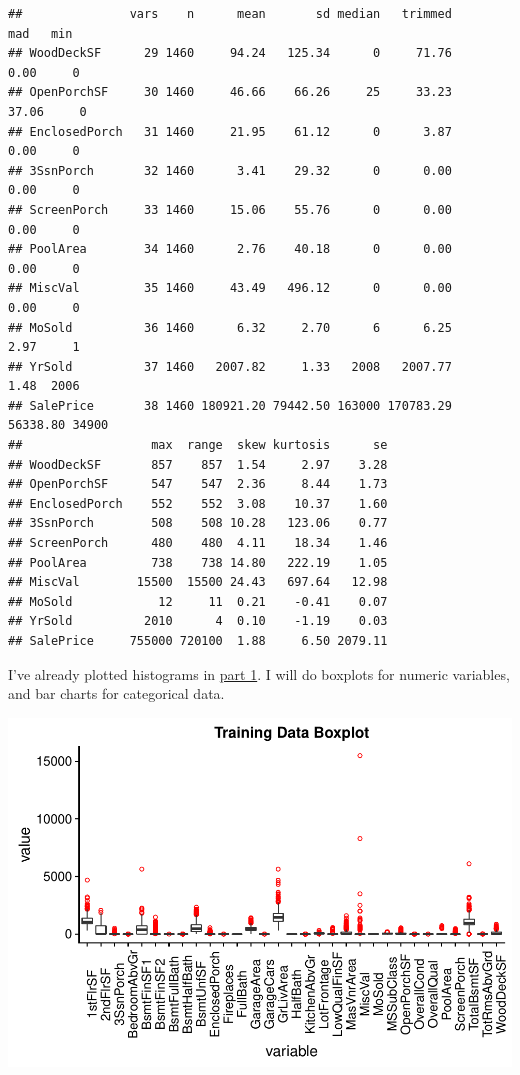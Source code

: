 \documentclass[]{article}
\begin{document}
\begin{verbatim}
##               vars    n      mean       sd median   trimmed      mad   min
## WoodDeckSF      29 1460     94.24   125.34      0     71.76     0.00     0
## OpenPorchSF     30 1460     46.66    66.26     25     33.23    37.06     0
## EnclosedPorch   31 1460     21.95    61.12      0      3.87     0.00     0
## 3SsnPorch       32 1460      3.41    29.32      0      0.00     0.00     0
## ScreenPorch     33 1460     15.06    55.76      0      0.00     0.00     0
## PoolArea        34 1460      2.76    40.18      0      0.00     0.00     0
## MiscVal         35 1460     43.49   496.12      0      0.00     0.00     0
## MoSold          36 1460      6.32     2.70      6      6.25     2.97     1
## YrSold          37 1460   2007.82     1.33   2008   2007.77     1.48  2006
## SalePrice       38 1460 180921.20 79442.50 163000 170783.29 56338.80 34900
##                  max  range  skew kurtosis      se
## WoodDeckSF       857    857  1.54     2.97    3.28
## OpenPorchSF      547    547  2.36     8.44    1.73
## EnclosedPorch    552    552  3.08    10.37    1.60
## 3SsnPorch        508    508 10.28   123.06    0.77
## ScreenPorch      480    480  4.11    18.34    1.46
## PoolArea         738    738 14.80   222.19    1.05
## MiscVal        15500  15500 24.43   697.64   12.98
## MoSold            12     11  0.21    -0.41    0.07
## YrSold          2010      4  0.10    -1.19    0.03
## SalePrice     755000 720100  1.88     6.50 2079.11
\end{verbatim}

I've already plotted histograms in \protect\hyperlink{kaggle-data}{part
1}. I will do boxplots for numeric variables, and bar charts for
categorical data.

\includegraphics{DATA_605_Final_Exam_files/figure-latex/boxplots-1.pdf}
\end{document}

